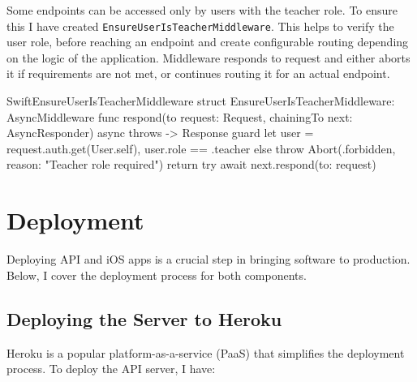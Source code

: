 \documentclass[
  biblatex,
  language=english,
  figures=false,
  sourcecodes,
  glossaries,
  index
]{kidiplom}
\begin{document}
Some endpoints can be accessed only by users with the teacher role. To ensure this I have created \texttt{EnsureUserIsTeacherMiddleware}. This helps to verify the user role, before reaching an endpoint and create configurable routing depending on the logic of the application. Middleware responds to request and either aborts it if requirements are not met, or continues routing it for an actual endpoint.

\begin{kicode}{Swift}{}{EnsureUserIsTeacherMiddleware}
struct EnsureUserIsTeacherMiddleware: AsyncMiddleware {
    func respond(to request: Request, chainingTo next: AsyncResponder) async throws -> Response {
        guard let user = request.auth.get(User.self),
              user.role == .teacher else {
            throw Abort(.forbidden, reason: "Teacher role required")
        }
        return try await next.respond(to: request)
    }
}
\end{kicode}

\section{Deployment}

Deploying API and iOS apps is a crucial step in bringing software to production. Below, I cover the deployment process for both components.

\subsection{Deploying the Server to Heroku}

Heroku is a popular platform-as-a-service (PaaS) that simplifies the deployment process. To deploy the API server, I have:
\end{document}
